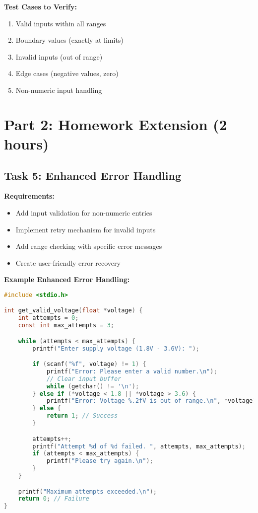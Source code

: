 \documentclass[11pt,a4paper]{article}
\begin{document}
\textbf{Test Cases to Verify:}
\begin{enumerate}
    \item Valid inputs within all ranges
    \item Boundary values (exactly at limits)
    \item Invalid inputs (out of range)
    \item Edge cases (negative values, zero)
    \item Non-numeric input handling
\end{enumerate}

\section{Part 2: Homework Extension (2 hours)}

\subsection{Task 5: Enhanced Error Handling}

\textbf{Requirements:}
\begin{itemize}
    \item Add input validation for non-numeric entries
    \item Implement retry mechanism for invalid inputs
    \item Add range checking with specific error messages
    \item Create user-friendly error recovery
\end{itemize}

\textbf{Example Enhanced Error Handling:}
\begin{lstlisting}[language=C]
#include <stdio.h>

int get_valid_voltage(float *voltage) {
    int attempts = 0;
    const int max_attempts = 3;

    while (attempts < max_attempts) {
        printf("Enter supply voltage (1.8V - 3.6V): ");

        if (scanf("%f", voltage) != 1) {
            printf("Error: Please enter a valid number.\n");
            // Clear input buffer
            while (getchar() != '\n');
        } else if (*voltage < 1.8 || *voltage > 3.6) {
            printf("Error: Voltage %.2fV is out of range.\n", *voltage);
        } else {
            return 1; // Success
        }

        attempts++;
        printf("Attempt %d of %d failed. ", attempts, max_attempts);
        if (attempts < max_attempts) {
            printf("Please try again.\n");
        }
    }

    printf("Maximum attempts exceeded.\n");
    return 0; // Failure
}
\end{lstlisting}
\end{document}
